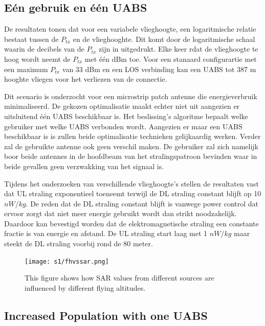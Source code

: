 \documentclass[twocolumn]{phdsymp} %
\begin{document}
\subsection{E\'en gebruik en \'e\'en \gls{UABS}}
De resultaten tonen dat voor een variabele vlieghoogte, een logaritmische relatie bestaat tussen de 
 $P_{tx}$ en de vlieghooghte.
 Dit komt door de logaritmische schaal waarin de decibels van de $P_{tx}$ zijn in uitgedrukt.
Elke keer rdat de vlieghoogte te hoog wordt neemt de $P_{tx}$ met \'e\'en dBm toe.
Voor een stanaard configurartie met een maximum $P_{tx}$ van 33 dBm en een \gls{LOS} verbinding kan een 
\gls{UABS} tot 387 m hooghte vliegen voor het verliezen van de connectie.

Dit scenario is onderzocht voor een microstrip patch antenne die energieverbruik minimaliseerd.
De gekozen optimalisatie maakt echter niet uit aangezien er uitsluitend \'e\'en \gls{UABS} beschikbaar is.
Het beslissing's algoritme bepaalt welke gebruiker met welke \gls{UABS} verbonden wordt.
Aangezien er maar een \gls{UABS} beschikbaar is is zullen beide optimalisatie technieken gelijkaardig werken.
Verder zal de gebruikte antenne ook geen verschil maken. 
De gebruiker zal zich namelijk boor beide antennes in de hoofdbeam van het stralingspatroon 
bevinden waar in beide gevallen geen verzwakking van het signaal is.




Tijdens het onderzoeken van verschillende vlieghoogte's stellen de resultaten vast  dat
\gls{UL} straling exponentieel toeneemt terwijl de \gls{DL} straling constant blijft op 
10 $nW/kg$. De reden dat de \gls{DL} straling constant blijft is vanwege power control dat ervoor zorgt
dat niet meer energie gebruikt wordt dan strikt noodzakelijk. 
Daardoor kan bevestigd worden dat de elektromagnetische straling een constante fractie is van energie en afstand.
De \gls{UL} straling start laag met 1 $nW/kg$ maar steekt de \gls{DL} straling voorbij rond de 80 meter.

\begin{figure}[]
\centering
  \texttt{[image: s1/fhvssar.png]}
  \caption{This figure shows how SAR values from different sources are influenced by different flying altitudes.}
  \label{fig:s1_fhsar}
\end{figure}

\subsection{Increased Population with one UABS}
\end{document}
